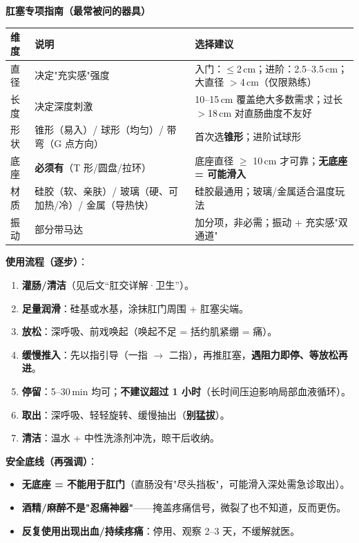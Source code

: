 \documentclass[12pt,UTF8,openany]{ctexbook}
\begin{document}
\textbf{肛塞专项指南（最常被问的器具）}\\
\begin{tabularx}{\textwidth}{l X X}
\toprule
\textbf{维度} & \textbf{说明} & \textbf{选择建议} \\
\midrule
直径 & 决定"充实感"强度 & 入门：$\leq$2\,cm；进阶：2.5--3.5\,cm；大直径 $>$4\,cm（仅限熟练） \\
长度 & 决定深度刺激 & 10--15\,cm 覆盖绝大多数需求；过长 $>$18\,cm 对直肠曲度不友好 \\
形状 & 锥形（易入）/ 球形（均匀）/ 带弯（G 点方向） & 首次选\textbf{锥形}；进阶试球形 \\
底座 & \textbf{必须有}（T 形/圆盘/拉环） & 底座直径 $\geq$ 10\,cm 才可靠；\textbf{无底座 = 可能滑入} \\
材质 & 硅胶（软、亲肤）/ 玻璃（硬、可加热/冷）/ 金属（导热快） & 硅胶最通用；玻璃/金属适合温度玩法 \\
振动 & 部分带马达 & 加分项，非必需；振动 + 充实感"双通道" \\
\bottomrule
\end{tabularx}
\par\smallskip
\noindent\textbf{使用流程（逐步）}：
\begin{enumerate}[leftmargin=2em,itemsep=0.2em]
  \item \textbf{灌肠/清洁}（见后文“肛交详解·卫生”）。
  \item \textbf{足量润滑}：硅基或水基，涂抹肛门周围 + 肛塞尖端。
  \item \textbf{放松}：深呼吸、前戏唤起（唤起不足 = 括约肌紧绷 = 痛）。
  \item \textbf{缓慢推入}：先以指引导（一指 $\to$ 二指），再推肛塞，\textbf{遇阻力即停、等放松再进}。
  \item \textbf{停留}：5--30\,min 均可；\textbf{不建议超过 1 小时}（长时间压迫影响局部血液循环）。
  \item \textbf{取出}：深呼吸、轻轻旋转、缓慢抽出（\textbf{别猛拔}）。
  \item \textbf{清洁}：温水 + 中性洗涤剂冲洗，晾干后收纳。
\end{enumerate}
\noindent\textbf{安全底线（再强调）}：
\begin{itemize}[leftmargin=2em,itemsep=0.2em]
  \item \textbf{无底座 = 不能用于肛门}（直肠没有"尽头挡板"，可能滑入深处需急诊取出）。
  \item \textbf{酒精/麻醉不是"忍痛神器"}——掩盖疼痛信号，微裂了也不知道，反而更伤。
  \item \textbf{反复使用出现出血/持续疼痛}：停用、观察 2--3 天，不缓解就医。
\end{itemize}
\end{document}
